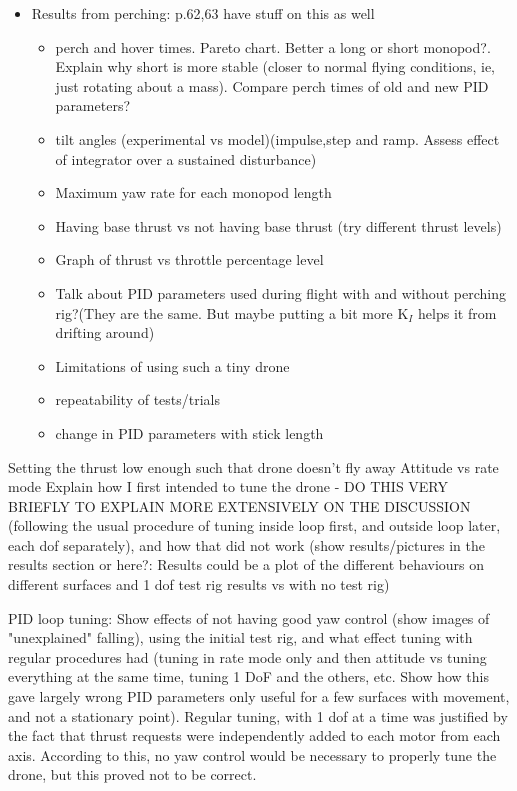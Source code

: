 \documentclass[12pt,a4paper]{article}
\begin{document}
\begin{itemize}
\begin{itemize}
\end{itemize} 
\item Results from perching: p.62,63 have stuff on this as well 
\begin{itemize}
\item perch and hover times. Pareto chart. Better a long or short monopod?. Explain why short is more stable (closer to normal flying conditions, ie, just rotating about a mass). Compare perch times of old and new PID parameters?
\item tilt angles (experimental vs model)(impulse,step and ramp. Assess effect of integrator over a sustained disturbance)
\item Maximum yaw rate for each monopod length
\item Having base thrust vs not having base thrust (try different thrust levels)
\item Graph of thrust vs throttle percentage level
\item Talk about PID parameters used during flight with and without perching rig?(They are the same. But maybe putting a bit more K$_I$ helps it from drifting around)
\item Limitations of using such a tiny drone
\item repeatability of tests/trials
\item change in PID parameters with stick length
\end{itemize}
\end{itemize}
Setting the thrust low enough such that drone doesn't fly away
Attitude vs rate mode
Explain how I first intended to tune the drone - DO THIS VERY BRIEFLY TO EXPLAIN MORE EXTENSIVELY ON THE DISCUSSION (following the usual procedure of tuning inside loop first, and outside loop later, each dof separately), and how that did not work (show results/pictures in the results section or here?: Results could be a plot of the different behaviours on different surfaces and 1 dof test rig results vs with no test rig) 


PID loop tuning: Show effects of not having good yaw control (show images of "unexplained" falling), using the initial test rig, and what effect tuning with regular procedures had (tuning in rate mode only and then attitude vs tuning everything at the same time, tuning 1 DoF and the others, etc. Show how this gave largely wrong PID parameters only useful for a few surfaces with movement, and not a stationary point). Regular tuning, with 1 dof at a time was justified by the fact that thrust requests were independently added to each motor from each axis. According to this, no yaw control would be necessary to properly tune the drone, but this proved not to be correct.
\end{document}

